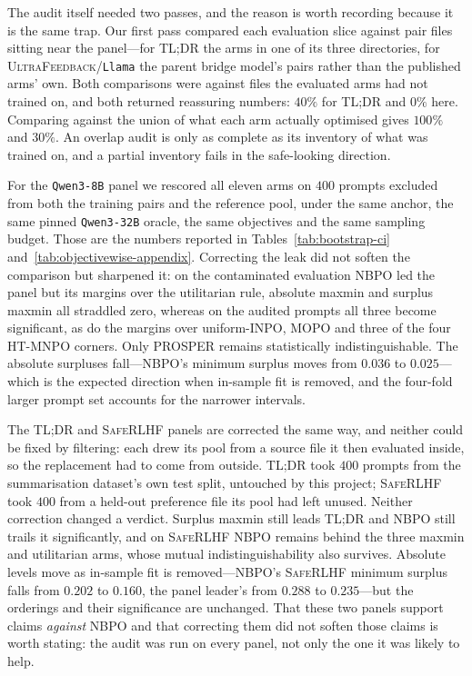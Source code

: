 \documentclass{article}
\theoremstyle{remark}
\theoremstyle{plain}
\newcommand{\NBPO}{\textsc{NBPO}}
\begin{document}
The audit itself needed two passes, and the reason is worth recording because it is the same trap. Our
first pass compared each evaluation slice against pair files sitting near the panel---for
\textsc{TL;DR} the arms in one of its three directories, for \textsc{UltraFeedback}/\texttt{Llama} the
parent bridge model's pairs rather than the published arms' own. Both comparisons were against files the
evaluated arms had not trained on, and both returned reassuring numbers: $40\%$ for \textsc{TL;DR} and
$0\%$ here. Comparing against the union of what each arm actually optimised gives $100\%$ and $30\%$. An
overlap audit is only as complete as its inventory of what was trained on, and a partial inventory fails
in the safe-looking direction.

For the \texttt{Qwen3-8B} panel we rescored all eleven arms on $400$ prompts excluded from both the
training pairs and the reference pool, under the same anchor, the same pinned \texttt{Qwen3-32B} oracle,
the same objectives and the same sampling budget. Those are the numbers reported in
Tables~\ref{tab:bootstrap-ci} and~\ref{tab:objectivewise-appendix}. Correcting the leak did not soften the
comparison but sharpened it: on the contaminated evaluation \NBPO{} led the panel but its margins over the
utilitarian rule, absolute maxmin and surplus maxmin all straddled zero, whereas on the audited prompts all
three become significant, as do the margins over uniform-INPO, MOPO and three of the four HT-MNPO corners.
Only PROSPER remains statistically indistinguishable. The absolute surpluses fall---\NBPO{}'s minimum
surplus moves from $0.036$ to $0.025$---which is the expected direction when in-sample fit is removed, and
the four-fold larger prompt set accounts for the narrower intervals.

The \textsc{TL;DR} and \textsc{SafeRLHF} panels are corrected the same way, and neither could be fixed by
filtering: each drew its pool from a source file it then evaluated inside, so the replacement had to come
from outside. \textsc{TL;DR} took $400$ prompts from the summarisation dataset's own test split, untouched
by this project; \textsc{SafeRLHF} took $400$ from a held-out preference file its pool had left unused.
Neither correction changed a verdict. Surplus maxmin still leads \textsc{TL;DR} and \NBPO{} still trails it
significantly, and on \textsc{SafeRLHF} \NBPO{} remains behind the three maxmin and utilitarian arms, whose
mutual indistinguishability also survives. Absolute levels move as in-sample fit is removed---\NBPO{}'s
\textsc{SafeRLHF} minimum surplus falls from $0.202$ to $0.160$, the panel leader's from $0.288$ to
$0.235$---but the orderings and their significance are unchanged. That these two panels support claims
\emph{against} \NBPO{} and that correcting them did not soften those claims is worth stating: the audit was
run on every panel, not only the one it was likely to help.
\end{document}
